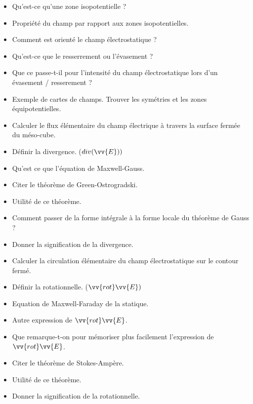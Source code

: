 \documentclass[a4paper, 11pt, hidelinks]{article}
\begin{document}
\begin{itemize}
    \item Qu'est-ce qu'une zone isopotentielle ? \cite{Chapitre9}
    \item Propriété du champ par rapport aux zones isopotentielles. \cite{Chapitre9}
    \item Comment est orienté le champ électrostatique ? \cite{Chapitre9}
    \item Qu'est-ce que le resserrement ou l'évasement ? \cite{Chapitre9}
    \item Que ce passe-t-il pour l'intensité du champ électrostatique lors d'un évasement / resserement ? \cite{Chapitre9}
    \item Exemple de cartes de champs. Trouver les symétries et les zones équipotentielles. \cite{Chapitre9}
    \item Calculer le flux élémentaire du champ électrique à travers la surface fermée du méso-cube. \cite{Chapitre10}
    \item Définir la divergence. ($div(\vv{E}))$ \cite{Chapitre10}
    \item Qu'est ce que l'équation de Maxwell-Gauss. \cite{Chapitre10}
    \item Citer le théorème de Green-Ostrogradski. \cite{Chapitre10} 
    \item Utilité de ce théorème. \cite{Chapitre10}
    \item Comment passer de la forme intégrale à la forme locale du théorème de Gauss ? \cite{Chapitre10}
    \item Donner la signification de la divergence. \cite{Chapitre10}
    \item Calculer la circulation élémentaire du champ électrostatique sur le contour fermé. \cite{Chapitre10}
    \item Définir la rotationnelle. ($\vv{rot}\vv{E})$ \cite{Chapitre10}
    \item Equation de Maxwell-Faraday de la statique. \cite{Chapitre10}
    \item Autre expression de $\vv{rot}\vv{E}$. \cite{Chapitre10}
    \item Que remarque-t-on pour mémoriser plus facilement l'expression de $\vv{rot}\vv{E}$. \cite{Chapitre10}
    \item Citer le théorème de Stokes-Ampère. \cite{Chapitre10}
    \item Utilité de ce théorème. \cite{Chapitre10}
    \item Donner la signification de la rotationnelle. \cite{Chapitre10}
\end{itemize}
\end{document}
